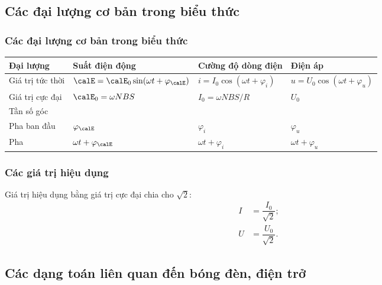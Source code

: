 \subsection{Các đại lượng cơ bản trong biểu thức}
\subsubsection{Các đại lượng cơ bản trong biểu thức}
\begin{tabular}{|>{\centering\arraybackslash}m{6em}|>{\centering\arraybackslash}m{10em}|>{\centering\arraybackslash}m{10em}|>{\centering\arraybackslash}m{10em}|}
	\hline
	\textbf{Đại lượng} & \textbf{Suất điện động} & \textbf{Cường độ dòng điện} & \textbf{Điện áp} \\
	\hline
	Giá trị tức thời& $\calE=\calE_0\sin (\omega t + \varphi_\calE)$ & $i=I_0\cos (\omega t + \varphi_i)$& $	u=U_0\cos (\omega t + \varphi_u)$ \\
	\hline
	Giá trị cực đại & $\calE_0=\omega NBS$ & $I_0=\omega NBS/R $ & $U_0$\\
	\hline 
	Tần số góc & \multicolumn{3}{c|}{$\omega=2\pi f = 2\pi / T$}\\
	\hline
	Pha ban đầu & $\varphi_\calE$ & $\varphi_i$ & $\varphi_u$ \\
	\hline
	Pha & $\omega t + \varphi_\calE$ & $\omega t + \varphi_i$ & $\omega t + \varphi_u$ \\
	\hline
\end{tabular}
\subsubsection{Các giá trị hiệu dụng}
Giá trị hiệu dụng bằng giá trị cực đại chia cho $\sqrt 2$:
\begin{align*}
	I&=\dfrac{I_0}{\sqrt 2};\\
	U&=\dfrac{U_0}{\sqrt 2}.
\end{align*}

\subsection{Các dạng toán liên quan đến bóng đèn, điện trở}
